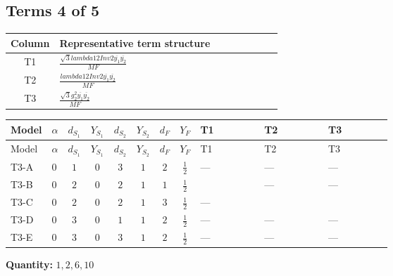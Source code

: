 \documentclass[8pt]{article}
\begin{document}
\begin{landscape}
\subsection*{Terms 4 of 5}
\begin{center}
\begin{tabular}{@{}c >{\raggedright\arraybackslash}p{0.82\linewidth}@{}}
\toprule
Column & Representative term structure \\
\midrule
T1 & \(\displaystyle \frac{\sqrt{3} lambda12Inv2 \overline{y_{1}} \overline{y_{2}}}{MF}\) \\
\midrule
T2 & \(\displaystyle \frac{lambda12Inv2 \overline{y_{1}} \overline{y_{2}}}{MF}\) \\
\midrule
T3 & \(\displaystyle \frac{\sqrt{3} g_{2}^{2} \overline{y_{1}} \overline{y_{2}}}{MF}\) \\
\midrule
\bottomrule
\end{tabular}
\end{center}
\smallskip
\tiny
\begin{longtable}{@{}llcccccc >{\raggedright\arraybackslash}p{0.21\linewidth} >{\raggedright\arraybackslash}p{0.21\linewidth} >{\raggedright\arraybackslash}p{0.21\linewidth}@{}}
\toprule
Model & $\alpha$ & $d_{S_1}$ & $Y_{S_1}$ & $d_{S_2}$ & $Y_{S_2}$ & $d_F$ & $Y_F$ & T1 & T2 & T3 \\
\midrule
\endfirsthead
\toprule
Model & $\alpha$ & $d_{S_1}$ & $Y_{S_1}$ & $d_{S_2}$ & $Y_{S_2}$ & $d_F$ & $Y_F$ & T1 & T2 & T3 \\
\midrule
\endhead
T3-A & $0$ & $1$ & $0$ & $3$ & $1$ & $2$ & $\frac{1}{2}$ & --- & --- & --- \\
\midrule
T3-B & $0$ & $2$ & $0$ & $2$ & $1$ & $1$ & $\frac{1}{2}$ & \scriptsize\adjustbox{max width=\linewidth}{$\begin{gathered} \frac{\sqrt{3} lambda12Inv2 \overline{y_{1}} \overline{y_{2}}}{6 MF}\end{gathered}$} & --- & --- \\
\midrule
T3-C & $0$ & $2$ & $0$ & $2$ & $1$ & $3$ & $\frac{1}{2}$ & --- & \scriptsize\adjustbox{max width=\linewidth}{$\begin{gathered} - \frac{lambda12Inv2 \overline{y_{1}} \overline{y_{2}}}{6 MF}\end{gathered}$} & \scriptsize\adjustbox{max width=\linewidth}{$\begin{gathered} - \frac{\sqrt{3} g_{2}^{2} \overline{y_{1}} \overline{y_{2}}}{8 MF}\end{gathered}$} \\
\midrule
T3-D & $0$ & $3$ & $0$ & $1$ & $1$ & $2$ & $\frac{1}{2}$ & --- & --- & --- \\
\midrule
T3-E & $0$ & $3$ & $0$ & $3$ & $1$ & $2$ & $\frac{1}{2}$ & --- & --- & --- \\
\midrule
\bottomrule
\end{longtable}
\clearpage
\noindent\textbf{Quantity: }$\mathrm{1,2,6,10}$\par\smallskip

\end{landscape}
\end{document}
